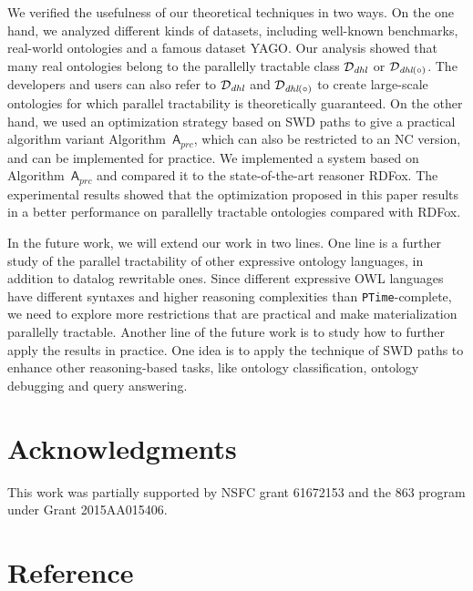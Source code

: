 \documentclass[final,1p,times]{elsarticle}
\begin{document}
We verified the usefulness of our theoretical techniques in two ways. On the one hand,
we analyzed different kinds of datasets,
including well-known benchmarks, real-world ontologies and a famous dataset YAGO.
Our analysis showed that many real ontologies belong to
the parallelly tractable class $\mathcal{D}_{\textit{\text{dhl}}}$
or $\mathcal{D}_{\textit{\text{dhl}}(\circ)}$. The
developers and users can also refer to $\mathcal{D}_{\textit{\text{dhl}}}$
and $\mathcal{D}_{\textit{\text{dhl}}(\circ)}$
to create large-scale ontologies for which parallel tractability
is theoretically guaranteed. On the other hand,
we used an optimization strategy based on SWD paths
to give a practical algorithm variant Algorithm~$\mathsf{A}_{prc}$, which can
also be restricted to an NC version, and can be implemented for practice.
We implemented a system based on Algorithm~$\mathsf{A}_{prc}$ and compared it to
the state-of-the-art reasoner RDFox.
The experimental results showed that the optimization proposed in this paper results
in a better performance on parallelly tractable ontologies compared with RDFox.

In the future work, we will extend our work in two lines.
One line is a further study of the parallel tractability of
other expressive ontology languages, in addition to
datalog rewritable ones. Since different expressive OWL languages
have different syntaxes and higher reasoning complexities than \texttt{PTime}-complete, we need to
explore more restrictions that are practical and make materialization
parallelly tractable. Another line of the future work is to
study how to further apply the
results in practice.
One idea is to apply the technique of SWD paths to enhance other reasoning-based tasks,
like ontology classification, ontology debugging and query answering.

\section*{Acknowledgments}

This work was partially supported by NSFC
grant 61672153 and the 863 program under Grant
2015AA015406.

\section*{Reference}




\clearpage
\end{document}
